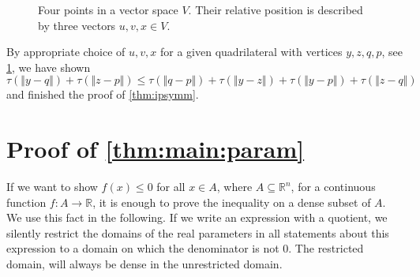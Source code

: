 \documentclass{article}
\renewcommand{\subset}{\subseteq}
\newcommand{\R}{\mathbb{R}}
\newcommand{\normof}[1]{\Vert #1 \Vert}
\newcommand{\tran}{\tau}
\begin{document}
\begin{appendix}
\begin{figure}
\begin{center}
	\end{center}
	\caption{Four points in a vector space $V$. Their relative position is described by three vectors $u,v,x\in V$.}\label{fig:symm:uvx}
\end{figure}%
By appropriate choice of $u, v, x$ for a given quadrilateral with vertices $y,z,q, p$, see \cref{fig:symm:uvx}, we have shown
\begin{equation}
	\tran(\normof{y-q}) + \tran(\normof{z-p}) \leq \tran(\normof{q-p}) + \tran(\normof{y-z})  +  \tran(\normof{y-p}) + \tran(\normof{z-q})
\end{equation}
and finished the proof of \cref{thm:ipsymm}.


\section{Proof of \cref{thm:main:param}}\label{app:mainproof}
%
If we want to show $f(x)\leq0$ for all $x\in A$, where $A\subset \R^n$, for a continuous function $f\colon A\to \R$, it is enough to prove the inequality on a dense subset of $A$. We use this fact in the following. If we write an expression with a quotient, we silently restrict the domains of the real parameters in all statements about this expression to a domain on which the denominator is not 0. The restricted domain, will always be dense in the unrestricted domain.
%
%
%

\end{appendix}
\end{document}
